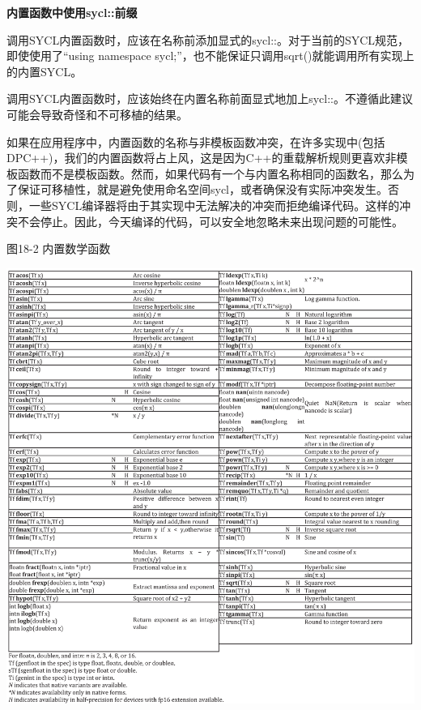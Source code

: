 \hspace*{\fill} \par %
\textbf{内置函数中使用sycl::前缀}

调用SYCL内置函数时，应该在名称前添加显式的sycl::。对于当前的SYCL规范，即使使用了“using namespace sycl;”，也不能保证只调用sqrt()就能调用所有实现上的内置SYCL。\par

\begin{tcolorbox}[colback=red!5!white,colframe=red!75!black]
调用SYCL内置函数时，应该始终在内置名称前面显式地加上sycl::。不遵循此建议可能会导致奇怪和不可移植的结果。
\end{tcolorbox}

如果在应用程序中，内置函数的名称与非模板函数冲突，在许多实现中(包括DPC++)，我们的内置函数将占上风，这是因为C++的重载解析规则更喜欢非模板函数而不是模板函数。然而，如果代码有一个与内置名称相同的函数名，那么为了保证可移植性，就是避免使用命名空间sycl，或者确保没有实际冲突发生。否则，一些SYCL编译器将由于其实现中无法解决的冲突而拒绝编译代码。这样的冲突不会停止。因此，今天编译的代码，可以安全地忽略未来出现问题的可能性。\par

\hspace*{\fill} \par %
图18-2 内置数学函数
\begin{center}
	\includegraphics[width=1.0\textwidth]{content/chapter-18/images/2}
\end{center}

